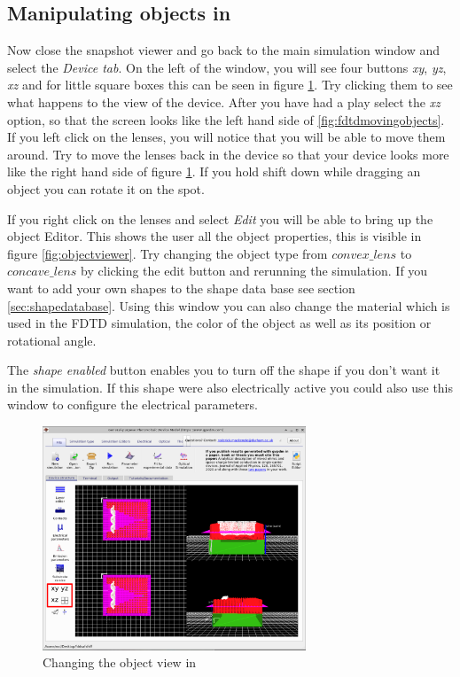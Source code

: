\subsection{Manipulating objects in \simname}
Now close the snapshot viewer and go back to the main simulation window and select the \emph{Device tab}.  On the left of the window, you will see four buttons \emph{xy}, \emph{yz}, \emph{xz} and for little square boxes this can be seen in figure \ref{fig:fdtdmainwindow}. Try clicking them to see what happens to the view of the device.  After you have had a play select the \emph{xz} option, so that the screen looks like the left hand side of \ref{fig:fdtdmovingobjects}.  If you left click on the lenses, you will notice that you will be able to move them around. Try to move the lenses back in the device so that your device looks more like the right hand side of figure \ref{fig:fdtdmainwindow}.  If you hold shift down while dragging an object you can rotate it on the spot.

If you right click on the lenses and select \emph{Edit} you will be able to bring up the object Editor.  This shows the user all the object properties, this is visible in figure \ref{fig:objectviewer}. Try changing the object type from $convex\_lens$ to $concave\_ lens$ by clicking the edit button and rerunning the simulation.  If you want to add your own shapes to the shape data base see section \ref{sec:shapedatabase}. Using this window you can also change the material which is used in the FDTD simulation, the color of the object as well as its position or rotational angle.

The \emph{shape enabled} button enables you to turn off the shape if you don't want it in the simulation. If this shape were also electrically active you could also use this window to configure the electrical parameters.

 
\begin{figure}[H]
\centering
\includegraphics[width=0.7\textwidth]{./images/fdtd_7.png}
\caption{Changing the object view in \simname}
\label{fig:fdtdmainwindow}
\end{figure}

